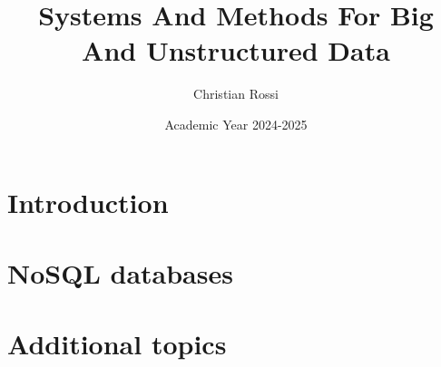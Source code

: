 \documentclass[12pt, a4paper]{report}
\title{\textbf{Systems And Methods For Big And Unstructured Data}}
\author{Christian Rossi}
\date{Academic Year 2024-2025}
\begin{document}
    \maketitle

    

    \cleardoublepage

    \tableofcontents

    \cleardoublepage

    \chapter{Introduction}
    
    
    
    

    \chapter{NoSQL databases}
    
    
    
    
    

    \appendix 
    \chapter{Additional topics}
    
\end{document}
